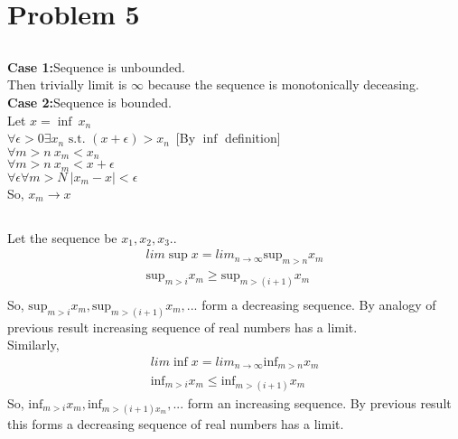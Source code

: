 \documentclass[paper=a4, fontsize=11pt]{scrartcl} %
\numberwithin{equation}{section} %
\numberwithin{figure}{section} %
\numberwithin{table}{section} %
\begin{document}
\section{Problem 5}	
\subsection{}
\textbf{Case 1:}Sequence is unbounded. \\
Then trivially limit is $\infty$ because the sequence is monotonically deceasing.\\
\textbf{Case 2:}Sequence is bounded.\\
Let $x = \inf \ x_n$\\
$\forall \epsilon >0 \exists x_n \text{ s.t. } (x+\epsilon)>x_n$\ [By $\inf$ definition]\\
$\forall m>n \ x_m<x_n$\\
$\forall m>n \ x_m<x+\epsilon$\\
$\forall \epsilon \forall m>N \ |x_m - x| < \epsilon$\\
So, $x_m \rightarrow x$\\
\subsection{}
Let the sequence be $x_1, x_2, x_3.. $\\
\begin{align*}
lim\; \text{sup}\; x = lim_{n\rightarrow \infty}\text{sup}_{m>n}x_m\\
\text{sup}_{m>i}x_m\geq \text{sup}_{m>(i+1)}x_m\\
\end{align*}
So, $\text{sup}_{m>i}x_m,\text{sup}_{m>(i+1)}x_m,...$ form a decreasing sequence. By analogy of previous result increasing sequence of real numbers has a limit. \\
Similarly,\\ 
\begin{align*}
lim\; \text{inf}\; x = lim_{n\rightarrow \infty}\text{inf}_{m>n}x_m\\
\text{inf}_{m>i}x_m\leq \text{inf}_{m>(i+1)}x_m
\end{align*}
So, $\text{inf}_{m>i}x_m,\text{inf}_{m>(i+1)x_m},...$ form an increasing sequence. By previous result this forms a decreasing sequence of real numbers has a limit. 
\end{document}
